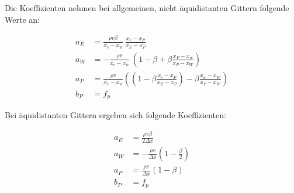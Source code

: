 \documentclass[10pt, ngerman,colorback,accentcolor=tud2d]{tudreport}
\begin{document}
Die Koeffizienten nehmen bei allgemeinen, nicht äquidistanten Gittern folgende Werte
an:

\begin{align*}
  a_E &= \frac{\rho v \beta}{x_e-x_w}\ \frac{x_e-x_P}{x_E-x_P}\\
  a_W &=-\frac{\rho v}{x_e-x_w}\ \left({1-\beta + \beta \frac{x_P-x_w}{x_P-x_W}}\right)\\
  a_P &= \frac{\rho v}{x_e-x_w} \left({
  \left({1-\beta \frac{x_e-x_P}{x_E-x_P}}\right)- \beta \frac{x_w-x_W}{x_P-x_W}
  }\right)\\
  b_P &= f_p
\end{align*}

Bei äquidistanten Gittern ergeben sich folgende Koeffizienten:

\begin{align*}
  a_E &= \frac{\rho v \beta}{2\Delta x}\\
  a_W &=-\frac{\rho v}{\Delta x}\left({1-\frac{\beta}{2} }\right)\\
  a_P &= \frac{\rho v}{\Delta x}(1-\beta)\\
  b_P &= f_p
\end{align*}
\end{document}
